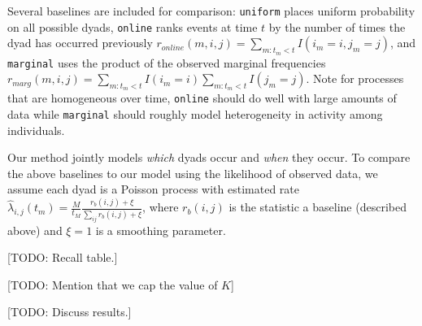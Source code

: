 


Several baselines are included for comparison: \texttt{uniform} places uniform probability on all possible dyads, \texttt{online} ranks events at time $t$ by the number of times the dyad has occurred previously $r_{online}(m,i,j) = \sum_{m:t_m < t} I(i_m=i,j_m=j)$, and \texttt{marginal} uses the product of the observed marginal frequencies $r_{marg}(m,i,j) = \sum_{m:t_m < t} I(i_m=i) \sum_{m:t_m < t} I(j_m=j)$.
Note for processes that are homogeneous over time, \texttt{online} should do well with large amounts of data while \texttt{marginal} should roughly model heterogeneity in activity among individuals.

Our method jointly models \emph{which} dyads occur and \emph{when} they occur.
To compare the above baselines to our model using the likelihood of observed data, we assume each dyad is a Poisson process with estimated  rate $\hat{\lambda}_{i,j}(t_m) = \frac{M}{t_M} \frac{r_{b}(i,j) + \xi}{\sum_{ij} r_{b}(i,j) + \xi}$, where $r_b(i,j)$ is the statistic a baseline (described above) and $\xi=1$ is a smoothing parameter.

[TODO: Recall table.]

[TODO: Mention that we cap the value of $K$]

[TODO: Discuss results.]
%





